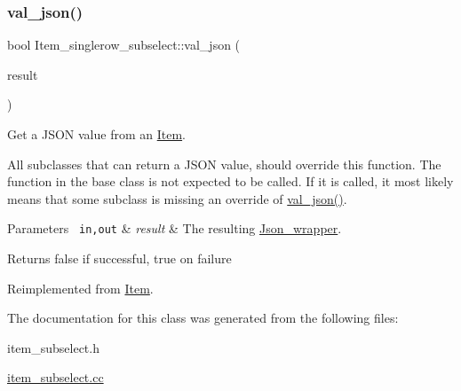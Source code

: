 \subsubsection{\texorpdfstring{val\+\_\+json()}{val\_json()}}
{\footnotesize\ttfamily bool Item\+\_\+singlerow\+\_\+subselect\+::val\+\_\+json (\begin{DoxyParamCaption}\item[{\mbox{\hyperlink{classJson__wrapper}{Json\+\_\+wrapper}} $\ast$}]{result }\end{DoxyParamCaption})\hspace{0.3cm}{\ttfamily [virtual]}}

Get a J\+S\+ON value from an \mbox{\hyperlink{classItem}{Item}}.

All subclasses that can return a J\+S\+ON value, should override this function. The function in the base class is not expected to be called. If it is called, it most likely means that some subclass is missing an override of \mbox{\hyperlink{classItem__singlerow__subselect_a0f7547c32eca8cc13e5670aca3fd5e86}{val\+\_\+json()}}.


\begin{DoxyParams}[1]{Parameters}
\mbox{\texttt{ in,out}}  & {\em result} & The resulting \mbox{\hyperlink{classJson__wrapper}{Json\+\_\+wrapper}}.\\
\hline
\end{DoxyParams}
\begin{DoxyReturn}{Returns}
false if successful, true on failure 
\end{DoxyReturn}


Reimplemented from \mbox{\hyperlink{classItem_a57e763fcde2d0a819d21e31c59611290}{Item}}.



The documentation for this class was generated from the following files\+:\begin{DoxyCompactItemize}
\item 
item\+\_\+subselect.\+h\item 
\mbox{\hyperlink{item__subselect_8cc}{item\+\_\+subselect.\+cc}}\end{DoxyCompactItemize}
